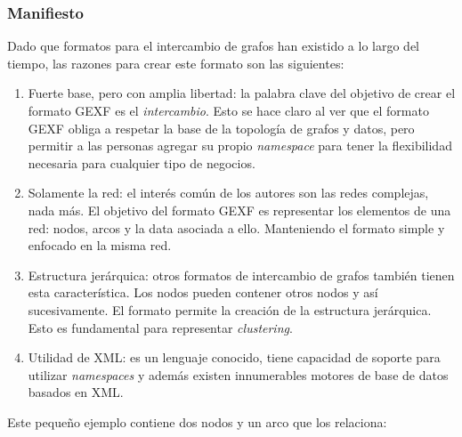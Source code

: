 \documentclass[12pt,oneside,letterpaper]{book}
\newcommand{\eng}[1]{\textit{#1}\xspace}			%
\newcommand{\abr}[1]{\textsc{#1}\xspace}           %
\theoremstyle{definition}
\begin{document}
\subsubsection{Manifiesto}
Dado que formatos para el intercambio de grafos han existido a lo largo del tiempo, las razones para crear este formato son las siguientes:

\begin{enumerate}
	\item Fuerte base, pero con amplia libertad: la palabra clave del objetivo de crear el formato \abr{GEXF} es el \emph{intercambio}. Esto se hace claro al ver que el formato \abr{GEXF} obliga a respetar la base de la topología de grafos y datos, pero permitir a las personas agregar su propio \eng{namespace} para tener la flexibilidad necesaria para cualquier tipo de negocios.
	\item Solamente la red: el interés común de los autores son las redes complejas, nada más. El objetivo del formato \abr{GEXF} es representar los elementos de una red: nodos, arcos y la data asociada a ello. Manteniendo el formato simple y enfocado en la misma red.
	\item Estructura jerárquica: otros formatos de intercambio de grafos también tienen esta característica. Los nodos pueden contener otros nodos y así sucesivamente. El formato permite la creación de la estructura jerárquica. Esto es fundamental para representar \eng{clustering}.
	\item Utilidad de \abr{XML}: es un lenguaje conocido, tiene capacidad de soporte para utilizar \eng{namespaces} y además existen innumerables motores de base de datos basados en XML.
\end{enumerate}

Este pequeño ejemplo contiene dos nodos y un arco que los relaciona:
\end{document}

